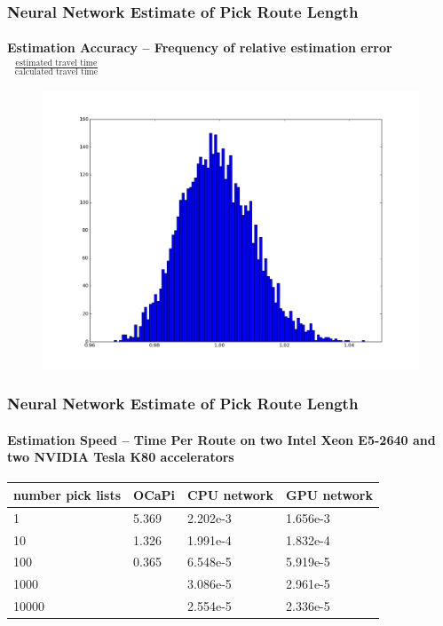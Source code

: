 \documentclass[english,a4,aspectratio=169]{beamer}
\begin{document}
\begin{frame}
 \frametitle{Neural Network Estimate of Pick Route Length}
 \framesubtitle{Estimation Accuracy -- Frequency of relative estimation error $\;\;\frac{\text{estimated travel time}}{\text{calculated travel time}}$}
 \begin{figure}
  \centering
  \includegraphics[height=.85\textheight]{../figures/estimation_error.png}
 \end{figure}
\end{frame}

\begin{frame}
 \frametitle{Neural Network Estimate of Pick Route Length}
 \framesubtitle{Estimation Speed -- Time Per Route on two Intel Xeon E5-2640 and two NVIDIA Tesla K80 accelerators}
 \begin{table}
  \begin{tabular}{l|lll}
number pick lists & OCaPi & CPU network & GPU network \\\hline
1    & 5.369 & 2.202e-3 & 1.656e-3 \\
10    & 1.326 & 1.991e-4 & 1.832e-4 \\
100   & 0.365 & 6.548e-5 & 5.919e-5 \\
1000  &       & 3.086e-5 & 2.961e-5 \\
10000 &       & 2.554e-5 & 2.336e-5
  \end{tabular}
 \end{table}
\end{frame}
\end{document}
